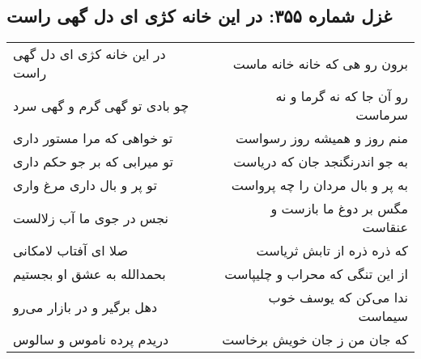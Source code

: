 \begin{center}
\section*{غزل شماره ۳۵۵: در این خانه کژی ای دل گهی راست}
\label{sec:0355}
\begin{longtable}{l p{0.5cm} r}
در این خانه کژی ای دل گهی راست
&&
برون رو هی که خانه خانه ماست
\\
چو بادی تو گهی گرم و گهی سرد
&&
رو آن جا که نه گرما و نه سرماست
\\
تو خواهی که مرا مستور داری
&&
منم روز و همیشه روز رسواست
\\
تو میرابی که بر جو حکم داری
&&
به جو اندرنگنجد جان که دریاست
\\
تو پر و بال داری مرغ واری
&&
به پر و بال مردان را چه پرواست
\\
نجس در جوی ما آب زلالست
&&
مگس بر دوغ ما بازست و عنقاست
\\
صلا ای آفتاب لامکانی
&&
که ذره ذره از تابش ثریاست
\\
بحمدالله به عشق او بجستیم
&&
از این تنگی که محراب و چلیپاست
\\
دهل برگیر و در بازار می‌رو
&&
ندا می‌کن که یوسف خوب سیماست
\\
دریدم پرده ناموس و سالوس
&&
که جان من ز جان خویش برخاست
\\
\end{longtable}
\end{center}
